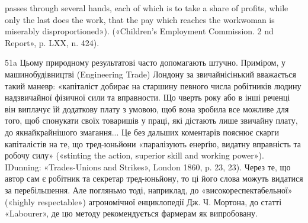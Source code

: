 passes through several hands, each of which is to take a share of profits,
while only the last does the work, that the pay which reaches the workwoman
is miserably disproportioned»). («Children’s Employment Commission.
2 nd Report», p. LXX, n. 424).

51a Цьому природному результатові часто допомагають штучно.
Приміром, у машинобудівництві (Engineering Trade) Лондону за звичайнісінький
вважається такий маневр: «капіталіст добирає на старшину
певного числа робітників людину надзвичайної фізичної сили та вправности.
Що чверть року або в інші реченці він виплачує їй додаткову плату
з умовою, щоб вона зробила все можливе для того, щоб спонукати своїх
товаришів у праці, які дістають лише звичайну плату, до якнайкрайнішого
змагання... Це без дальших коментарів пояснює скарги капіталістів на
те, що тред-юньйони «паралізують енерґію, видатну вправність та
робочу силу» («stinting the action, superior skill and working power»).
IDunning: «Trades-Unions and Strikes», London 1860, p. 23, 23). Через
те, що автор сам є робітник та секретар тред-юньйону, то ці його слова
можуть видатися за перебільшення. Але погляньмо тоді, наприклад,
до «високореспектабельної» («highly respectable») агрономічної енциклопедії
Дж. Ч. Мортона, до статті «Labourer», де цю методу рекомендується
фармерам як випробовану.
\parbreak{}  %
